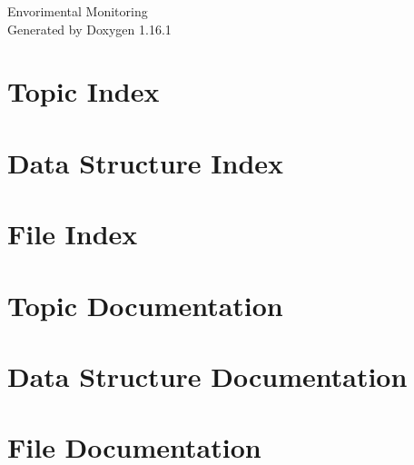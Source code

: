 \documentclass[twoside]{book}
\newcommand{\+}{\discretionary{\mbox{\scriptsize$\hookleftarrow$}}{}{}}
\newcommand{\clearemptydoublepage}{%
    \newpage{\pagestyle{empty}\cleardoublepage}%
  }
\begin{document}
  \raggedbottom
    \hypersetup{pageanchor=false,
                bookmarksnumbered=true,
                pdfencoding=unicode
               }
  \begin{titlepage}
  \vspace*{7cm}
  \begin{center}%
  {\Large Envorimental Monitoring}\\
  \vspace*{1cm}
  {\large Generated by Doxygen 1.16.1}\\
  \end{center}
  \end{titlepage}
  \clearemptydoublepage
  \tableofcontents
  \clearemptydoublepage
  \hypersetup{pageanchor=true}
\chapter{Topic Index}

\chapter{Data Structure Index}

\chapter{File Index}

\chapter{Topic Documentation}

\chapter{Data Structure Documentation}








\chapter{File Documentation}


























  \backmatter
  \newpage
  \clearemptydoublepage
  \printindex
\end{document}
